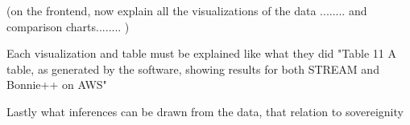 (on the frontend, now explain all the visualizations of the data ........ and comparison charts........ )

Each visualization and table must be explained like what they did "Table 11 A table, as generated by the software, showing results for both STREAM and Bonnie++ on AWS"


Lastly what inferences can be drawn from the data, that relation to sovereignity 


